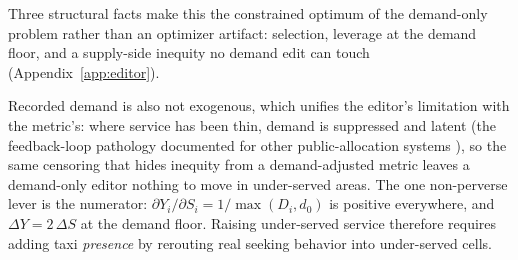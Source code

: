 Three structural facts make this the constrained optimum of the demand-only
problem rather than an optimizer artifact: selection, leverage at the demand
floor, and a supply-side inequity no demand edit can touch
(Appendix~\ref{app:editor}).

Recorded demand is also not exogenous, which unifies the editor's limitation
with the metric's: where service has been thin, demand is suppressed and
latent (the feedback-loop pathology documented for other public-allocation
systems \cite{ensign2018,lumisaac2016}), so the same censoring that hides
inequity from a demand-adjusted metric leaves a demand-only editor nothing to
move in under-served areas. The one non-perverse lever is the numerator:
$\partial Y_i / \partial S_i = 1 / \max(D_i, d_0)$ is positive everywhere, and
$\Delta Y = 2\,\Delta S$ at the demand floor. Raising under-served service
therefore requires adding taxi \emph{presence} by rerouting real seeking
behavior into under-served cells.

